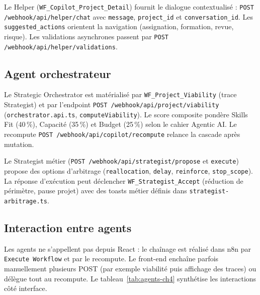 Le Helper (\texttt{WF\_Copilot\_Project\_Detail}) fournit le dialogue contextualisé : \texttt{POST /webhook/api/helper/chat} avec \texttt{message}, \texttt{project\_id} et \texttt{conversation\_id}. Les \texttt{suggested\_actions} orientent la navigation (assignation, formation, revue, risque). Les validations asynchrones passent par \texttt{POST /webhook/api/helper/validations}.

\subsection{Agent orchestrateur}

Le Strategic Orchestrator est matérialisé par \texttt{WF\_Project\_Viability} (trace Strategist) et par l'endpoint \texttt{POST /webhook/api/project/viability} (\texttt{orchestrator.api.ts}, \texttt{computeViability}). Le score composite pondère Skills Fit (40\,\%), Capacité (35\,\%) et Budget (25\,\%) selon le cahier Agentic AI. Le recompute \texttt{POST /webhook/api/copilot/recompute} relance la cascade après mutation.

Le Strategist métier (\texttt{POST /webhook/api/strategist/propose} et \texttt{execute}) propose des options d'arbitrage (\texttt{reallocation}, \texttt{delay}, \texttt{reinforce}, \texttt{stop\_scope}). La réponse d'exécution peut déclencher \texttt{WF\_Strategist\_Accept} (réduction de périmètre, pause projet) avec des toasts métier définis dans \texttt{strategist-arbitrage.ts}.

\subsection{Interaction entre agents}

Les agents ne s'appellent pas depuis React : le chaînage est réalisé dans n8n par \texttt{Execute Workflow} et par le recompute. Le front-end enchaîne parfois manuellement plusieurs POST (par exemple viabilité puis affichage des traces) ou délègue tout au recompute. Le tableau~\ref{tab:agents-ch4} synthétise les interactions côté interface.

